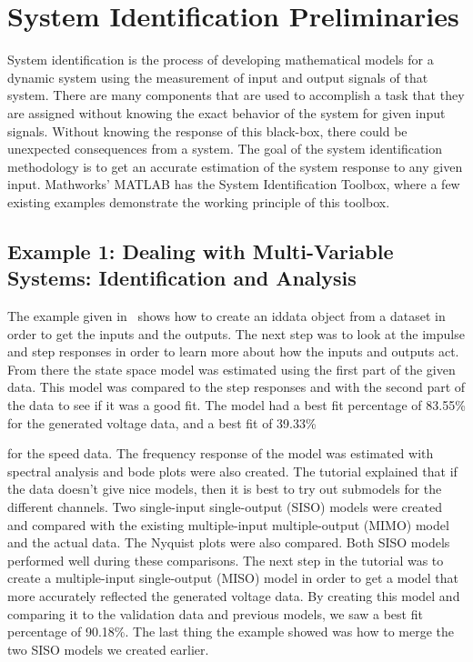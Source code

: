 \documentclass[journal,twoside,web]{ieeecolor}
\begin{document}
\section{System Identification Preliminaries}

System identification is the process of developing mathematical models for a dynamic system using the measurement of input and output signals of that system. There are many components that are used to accomplish a task that they are assigned without knowing the exact behavior of the system for given input signals. Without knowing the response of this black-box, there could be unexpected consequences from a system. The goal of the system identification methodology is to get an accurate estimation of the system response to any given input. Mathworks' MATLAB has the System Identification Toolbox, where a few existing examples demonstrate the working principle of this toolbox.

\subsection{Example 1: Dealing with Multi-Variable Systems: Identification and Analysis}
\label{sec:sysID-Example1}

The example given in~\cite{example1} shows how to create an iddata object from a
dataset in order to get the inputs and the outputs. The next step was to look at
the impulse and step responses in order to learn more about how the inputs and
outputs act. From there the state space model was estimated using the first part
of the given data. This model was compared to the step responses and with the
second part of the data to see if it was a good fit. The model had a best fit
percentage of 83.55\% for the generated voltage data, and a best fit of 39.33\%

for the speed data. The frequency response of the model was estimated with
spectral analysis and bode plots were also created. The tutorial explained that
if the data doesn’t give nice models, then it is best to try out submodels for
the different channels. Two single-input single-output (SISO) models were
created and compared with the existing multiple-input multiple-output (MIMO)
model and the actual data. The Nyquist plots were also compared. Both SISO
models performed well during these comparisons. The next step in the tutorial
was to create a multiple-input single-output (MISO) model in order to get a
model that more accurately reflected the generated voltage data. By creating
this model and comparing it to the validation data and previous models, we saw a
best fit percentage of 90.18\%. The last thing the example showed was how to
merge the two SISO models we created earlier.
\end{document}
